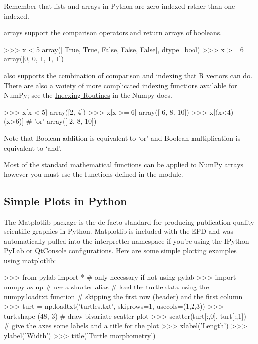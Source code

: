 Remember that lists and arrays in Python are zero-indexed rather than
one-indexed.
%

\numpy arrays support the comparison operators and return arrays of
booleans.
\begin{python}
    >>> x < 5 
    array([ True, True, False, False, False], dtype=bool)
    >>> x >= 6 
    array([0, 0, 1, 1, 1])
\end{python}
%
\numpy also supports the combination of comparison and indexing that R vectors
can do. There are also a variety of more complicated indexing functions
available for NumPy; see the
\href{http://docs.scipy.org/doc/numpy/reference/routines.indexing.html}{Indexing Routines} in the Numpy docs.
%
\begin{python}
>>> x[x < 5]
array([2, 4])
>>> x[x >= 6]
array([ 6,  8, 10])
>>> x[(x<4)+(x>6)]  # 'or'
array([ 2,  8, 10])
\end{python}
%
Note that Boolean addition is equivalent to `or' and Boolean
multiplication is equivalent to `and'.

Most of the standard mathematical functions can be applied to NumPy
arrays however you must use the functions defined in the
\numpy module.
%


\subsection{Simple Plots in Python}

The Matplotlib package is the de facto standard for producing
publication quality scientific graphics in Python. Matplotlib is
included with the EPD and was automatically pulled into the interpretter
namespace if you're using the IPython PyLab or QtConsole configurations. Here are some simple plotting examples using matplotlib:
%
\begin{python}
>>> from pylab import * # only necessary if not using pylab
>>> import numpy as np # use a shorter alias
# load the turtle data using the numpy.loadtxt function 
# skipping the first row (header) and the first column 
>>> turt = np.loadtxt('turtles.txt', skiprows=1, 
                      usecols=(1,2,3))
>>> turt.shape
(48, 3)
# draw bivariate scatter plot
>>> scatter(turt[:,0], turt[:,1])
# give the axes some labels and a title for the plot
>>> xlabel('Length')
>>> ylabel('Width')
>>> title('Turtle morphometry')
\end{python}